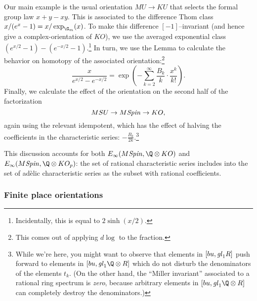 Our main example is the usual orientation $MU \to KU$ that selects the formal group law $x + y - xy$.  This is associated to the difference Thom class $x / (e^x - 1) = x / \exp_{\G_m}(x)$.  To make this difference $[-1]$--invariant (and hence give a complex-orientation of $KO$), we use the averaged exponential class $(e^{x/2} - 1) - (e^{-x/2} - 1)$.\footnote{Incidentally, this is equal to $2\operatorname{sinh}(x/2)$.}  In turn, we use the Lemma to calculate the behavior on homotopy of the associated orientation:\footnote{This comes out of applying $d\log$ to the fraction.} \[\frac{x}{e^{x/2} - e^{-x/2}} = \exp\left(-\sum_{k=2}^\infty \frac{B_k}{k} \cdot \frac{x^k}{k!}\right).\]  Finally, we calculate the effect of the orientation on the second half of the factorization \[MSU \to M\mathit{Spin} \to KO,\] again using the relevant idempotent, which has the effect of halving the coefficients in the characteristic series: $-\frac{B_k}{2k}$.\footnote{While we're here, you might want to observe that elements in $[bu, \mathit{gl}_1 R]$ push forward to elements in $[bu, \gl_1 \Q \otimes R]$ which do not disturb the denominators of the elements $t_k$.  (On the other hand, the ``Miller invariant'' associated to a rational ring spectrum is \emph{zero}, because arbitrary elements in $[bu, \gl_1 \Q \otimes R]$ can completely destroy the denominators.)}

This discussion accounts for both $E_\infty(M\Spin, \Q \otimes KO)$ and $E_\infty(M\Spin, \Q \otimes KO_p)$: the set of rational characteristic series includes into the set of ad\`elic characteristic series as the subset with rational coefficients.




\subsubsection{Finite place orientations}\label{FinitePlaceOrientationsSubsection}
\newcommand{\spin}{\mathit{spin}}

